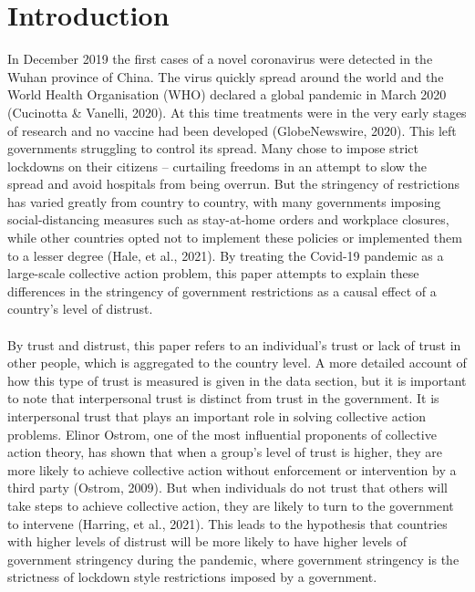 \documentclass[
  11pt,
]{article}
\begin{document}
\clearpage
\tableofcontents
{} 
\newpage
{}

\hypertarget{introduction}{%
\section{Introduction}\label{introduction}}

In December 2019 the first cases of a novel coronavirus were detected in the Wuhan province of China. The virus quickly spread around the world and the World Health Organisation (WHO) declared a global pandemic in March 2020 (Cucinotta \& Vanelli, 2020). At this time treatments were in the very early stages of research and no vaccine had been developed (GlobeNewswire, 2020). This left governments struggling to control its spread. Many chose to impose strict lockdowns on their citizens -- curtailing freedoms in an attempt to slow the spread and avoid hospitals from being overrun. But the stringency of restrictions has varied greatly from country to country, with many governments imposing social-distancing measures such as stay-at-home orders and workplace closures, while other countries opted not to implement these policies or implemented them to a lesser degree (Hale, et al., 2021). By treating the Covid-19 pandemic as a large-scale collective action problem, this paper attempts to explain these differences in the stringency of government restrictions as a causal effect of a country's level of distrust.\\
~\\
By trust and distrust, this paper refers to an individual's trust or lack of trust in other people, which is aggregated to the country level. A more detailed account of how this type of trust is measured is given in the data section, but it is important to note that interpersonal trust is distinct from trust in the government. It is interpersonal trust that plays an important role in solving collective action problems. Elinor Ostrom, one of the most influential proponents of collective action theory, has shown that when a group's level of trust is higher, they are more likely to achieve collective action without enforcement or intervention by a third party (Ostrom, 2009). But when individuals do not trust that others will take steps to achieve collective action, they are likely to turn to the government to intervene (Harring, et al., 2021). This leads to the hypothesis that countries with higher levels of distrust will be more likely to have higher levels of government stringency during the pandemic, where government stringency is the strictness of lockdown style restrictions imposed by a government.\\
\end{document}
